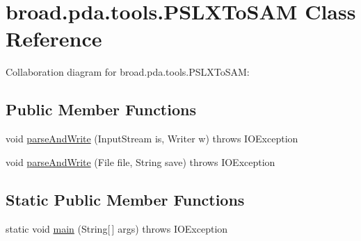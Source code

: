 \hypertarget{classbroad_1_1pda_1_1tools_1_1_p_s_l_x_to_s_a_m}{\section{broad.\+pda.\+tools.\+P\+S\+L\+X\+To\+S\+A\+M Class Reference}
\label{classbroad_1_1pda_1_1tools_1_1_p_s_l_x_to_s_a_m}
}


Collaboration diagram for broad.\+pda.\+tools.\+P\+S\+L\+X\+To\+S\+A\+M\+:
\subsection*{Public Member Functions}
\begin{DoxyCompactItemize}
\item 
void \hyperlink{classbroad_1_1pda_1_1tools_1_1_p_s_l_x_to_s_a_m_a5cf7cb5c9edfba192cd2b928162eddc0}{parse\+And\+Write} (Input\+Stream is, Writer w)  throws I\+O\+Exception
\item 
void \hyperlink{classbroad_1_1pda_1_1tools_1_1_p_s_l_x_to_s_a_m_a861494045104170f1a46c1d827baa47c}{parse\+And\+Write} (File file, String save)  throws I\+O\+Exception
\end{DoxyCompactItemize}
\subsection*{Static Public Member Functions}
\begin{DoxyCompactItemize}
\item 
static void \hyperlink{classbroad_1_1pda_1_1tools_1_1_p_s_l_x_to_s_a_m_a1af5eeda8d2c15e4d051c3825d16093d}{main} (String\mbox{[}$\,$\mbox{]} args)  throws I\+O\+Exception
\end{DoxyCompactItemize}


